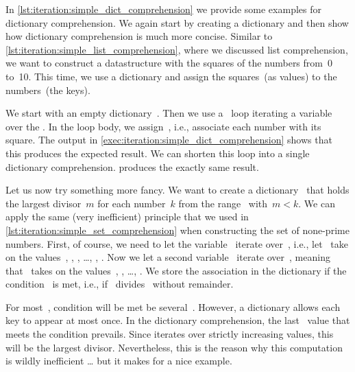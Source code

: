 %
%
%
%
In \cref{lst:iteration:simple_dict_comprehension} we provide some examples for dictionary comprehension.
We again start by  creating a dictionary and then show how dictionary comprehension is much more concise.
Similar to \cref{lst:iteration:simple_list_comprehension}, where we discussed list comprehension, we want to construct a datastructure with the squares of the numbers from~0 to~10.
This time, we use a dictionary and assign the squares~(as values) to the numbers~(the keys).

We start with an empty dictionary~.
Then we use a ~loop iterating a variable~ over the .
In the loop body, we assign~, i.e., associate each number with its square.
The output in \cref{exec:iteration:simple_dict_comprehension} shows that this produces the expected result.
We can shorten this loop into a single dictionary comprehension.
 produces the exactly same result.

Let us now try something more fancy.
We want to create a dictionary~ that holds the largest divisor~$m$ for each number~$k$ from the range~ with~$m<k$.
We can apply the same (very inefficient) principle that we used in \cref{lst:iteration:simple_set_comprehension} when constructing the set of none-prime numbers.
First, of course, we need to let the variable~ iterate over~, i.e., let~ take on the values~, , , \dots, , .
Now we let a second variable~ iterate over~, meaning that~ takes on the values~, , \dots, .
We store the association  in the dictionary if the condition~ is met, i.e., if~ divides~ without remainder.

For most~, condition will be met be several~.
However, a dictionary allows each key to appear at most once.
In the dictionary comprehension, the last~ value that meets the condition prevails.
Since  iterates over strictly increasing values, this will be the largest divisor.
Nevertheless, this is the reason why this computation is wildly inefficient {\dots} but it makes for a nice example.

